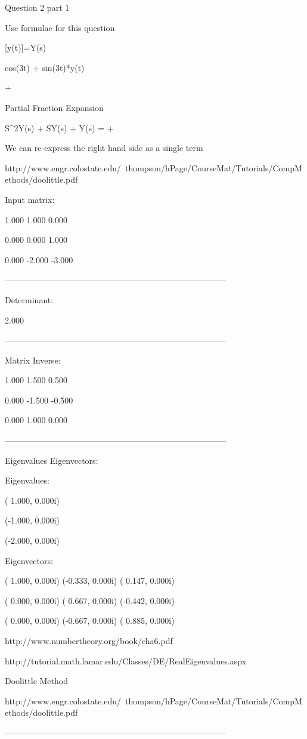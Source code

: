 
Question 2 part 1

Use formulae for this question

[y(t)]=Y(s)

cos(3t) + sin(3t)*y(t)

 + 

Partial Fraction Expansion 

S^2Y(s) + SY(s) + Y(s) = +

We can re-express the right hand side as a single term 

http://www.engr.colostate.edu/~thompson/hPage/CourseMat/Tutorials/CompMethods/doolittle.pdf




Input matrix:

 1.000  1.000  0.000

 0.000  0.000  1.000

 0.000 -2.000 -3.000

--------------------------------------------------------------------------------

Determinant:

 2.000

 

--------------------------------------------------------------------------------

Matrix Inverse:

 1.000  1.500  0.500

 0.000 -1.500 -0.500

 0.000  1.000  0.000

--------------------------------------------------------------------------------

Eigenvalues Eigenvectors:

 Eigenvalues:

( 1.000, 0.000i)

(-1.000, 0.000i)

(-2.000, 0.000i)

 Eigenvectors:

( 1.000, 0.000i) (-0.333, 0.000i) ( 0.147, 0.000i)

( 0.000, 0.000i) ( 0.667, 0.000i) (-0.442, 0.000i)

( 0.000, 0.000i) (-0.667, 0.000i) ( 0.885, 0.000i)

http://www.numbertheory.org/book/cha6.pdf

http://tutorial.math.lamar.edu/Classes/DE/RealEigenvalues.aspx

Doolittle Method

http://www.engr.colostate.edu/~thompson/hPage/CourseMat/Tutorials/CompMethods/doolittle.pdf

 

--------------------------------------------------------------------------------

 


